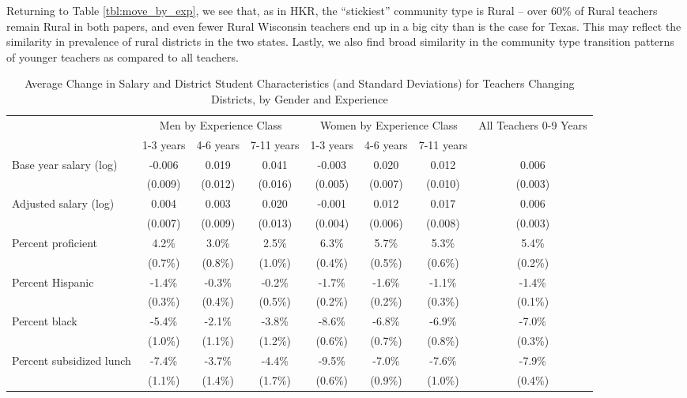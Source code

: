 \documentclass[12pt,]{article}
\begin{document}
Returning to Table \ref{tbl:move_by_exp}, we see that, as in HKR, the
``stickiest'' community type is Rural -- over 60\% of Rural teachers
remain Rural in both papers, and even fewer Rural Wisconsin teachers end
up in a big city than is the case for Texas. This may reflect the
similarity in prevalence of rural districts in the two states. Lastly,
we also find broad similarity in the community type transition patterns
of younger teachers as compared to all teachers.

\begin{sidewaystable}[htbp]
\centering
\begin{tabular}{lccccccc}
  \hline
 & \multicolumn{3}{c}{Men by Experience Class} & \multicolumn{3}{c}{Women by Experience Class} & \multirow{2}{*}{\parbox{0.1\linewidth}{All Teachers 0-9 Years}}\\ \cline{2-4} \cline{5-7}
 & 1-3 years & 4-6 years & 7-11 years & 1-3 years & 4-6 years & 7-11 years &  \\ 
  \hline
Base year salary (log) & -0.006 & 0.019 & 0.041 & -0.003 & 0.020 & 0.012 & 0.006 \\ 
   & (0.009) & (0.012) & (0.016) & (0.005) & (0.007) & (0.010) & (0.003) \\ 
  Adjusted salary (log) & 0.004 & 0.003 & 0.020 & -0.001 & 0.012 & 0.017 & 0.006 \\ 
   & (0.007) & (0.009) & (0.013) & (0.004) & (0.006) & (0.008) & (0.003) \\ 
  Percent proficient & 4.2\% & 3.0\% & 2.5\% & 6.3\% & 5.7\% & 5.3\% & 5.4\% \\ 
   & (0.7\%) & (0.8\%) & (1.0\%) & (0.4\%) & (0.5\%) & (0.6\%) & (0.2\%) \\ 
  Percent Hispanic & -1.4\% & -0.3\% & -0.2\% & -1.7\% & -1.6\% & -1.1\% & -1.4\% \\ 
   & (0.3\%) & (0.4\%) & (0.5\%) & (0.2\%) & (0.2\%) & (0.3\%) & (0.1\%) \\ 
  Percent black & -5.4\% & -2.1\% & -3.8\% & -8.6\% & -6.8\% & -6.9\% & -7.0\% \\ 
   & (1.0\%) & (1.1\%) & (1.2\%) & (0.6\%) & (0.7\%) & (0.8\%) & (0.3\%) \\ 
  Percent subsidized lunch & -7.4\% & -3.7\% & -4.4\% & -9.5\% & -7.0\% & -7.6\% & -7.9\% \\ 
   & (1.1\%) & (1.4\%) & (1.7\%) & (0.6\%) & (0.9\%) & (1.0\%) & (0.4\%) \\ 
   \hline
\end{tabular}
\caption{Average Change in Salary and District Student Characteristics (and Standard Deviations) for Teachers Changing Districts, by Gender and Experience} 
\label{tbl:change_by_ge}
\end{sidewaystable}
\end{document}
